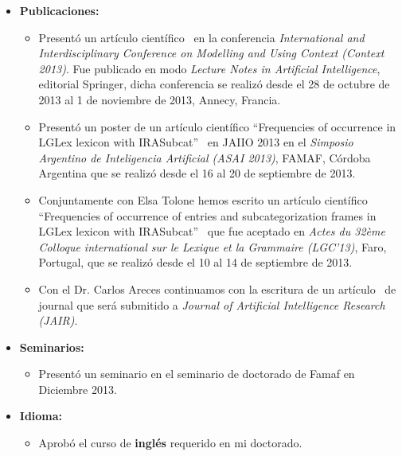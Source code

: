 \begin{itemize}
\begin{itemize}
\item La doctoranda present\'o un art\'iculo cient\'ifico~\cite{benotti-altamirano-context2013} en la conferencia \emph{International and Interdisciplinary Conference on Modelling and Using Context (Context 2013)}. Fue publicado en modo \emph{lecture notes in Artificial Intelligence}, editorial Springer, dicha conferencia se realiz\'o desde el 28 de octubre de 2013 al 1 de noviembre de 2013, Annecy, Francia. En la presentaci\'on que realiz\'o en CONTEXT 2013 conoci\'o varios investigadores del \'area los cuales se mostraron interesados en el trabajo: Dra. Roberts Craige de Ohio	State	University, Dr. Stone Matthew, Rutgers, USA.
\end{itemize}
\item \textbf{Publicaciones:} 
\begin{itemize}
\item Present\'o un art\'iculo cient\'ifico~\cite{benotti-altamirano-context2013} en la conferencia \emph{International and Interdisciplinary Conference on Modelling and Using Context (Context 2013)}. Fue publicado en modo \emph{Lecture Notes in Artificial Intelligence}, editorial Springer, dicha conferencia se realiz\'o desde el 28 de octubre de 2013 al 1 de noviembre de 2013, Annecy, Francia.
\item Present\'o un poster de un art\'iculo cient\'ifico ``Frequencies of occurrence in LGLex lexicon with IRASubcat''~\cite{tolone-altamirano} en JAIIO 2013 en el \emph{Simposio Argentino de Inteligencia Artificial (ASAI 2013)}, FAMAF, C\'ordoba Argentina que se realiz\'o desde el 16 al 20 de septiembre de 2013.
\item Conjuntamente con Elsa Tolone hemos escrito un art\'iculo cient\'ifico ``Frequencies of occurrence of entries and subcategorization frames in LGLex lexicon with IRASubcat''~\cite{tolone-altamirano-2} que fue aceptado en \emph{Actes du 32\`eme Colloque international sur le Lexique et la Grammaire (LGC'13)}, Faro, Portugal, que se realiz\'o desde el 10 al 14 de septiembre de 2013.
\item Con el Dr. Carlos Areces continuamos con la escritura de un art\'iculo~\cite{benotti-altamirano-jair} de journal que ser\'a submitido a \emph{Journal of Artificial Intelligence Research (JAIR)}.
\end{itemize}

\item \textbf{Seminarios:}
\begin{itemize}
\item Present\'o un seminario en el seminario de doctorado de Famaf en Diciembre 2013.
\end{itemize}
\item \textbf{Idioma:}
\begin{itemize}
\item Aprob\'o el curso de \textbf{ingl\'es} requerido en mi doctorado.


\end{itemize}
\end{itemize}
